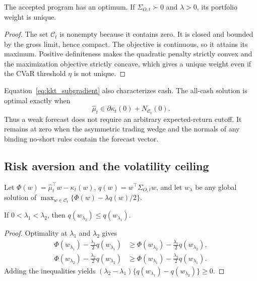 \begin{proposition}
The accepted program has an optimum. If \(\Sigma_{O,t}\succ0\) and \(\lambda>0\), its
portfolio weight is unique.
\end{proposition}
\begin{proof}
The set \(\mathcal C_t\) is nonempty because it contains zero. It is closed and bounded
by the gross limit, hence compact. The objective is continuous, so it attains its maximum.
Positive definiteness makes the quadratic penalty strictly convex and the maximization
objective strictly concave, which gives a unique weight even if the CVaR threshold
\(\eta\) is not unique.
\end{proof}

Equation~\eqref{eq:kkt_subgradient} also characterizes cash. The all-cash solution is
optimal exactly when
\begin{equation}
  \widehat\mu_t\in\partial\kappa_t(0)+N_{\mathcal C_t}(0).
  \label{eq:cash_kkt}
\end{equation}
Thus a weak forecast does not require an arbitrary expected-return cutoff. It remains at
zero when the asymmetric trading wedge and the normals of any binding no-short rules
contain the forecast vector.

\subsection{Risk aversion and the volatility ceiling}

Let \(\Phi(w)=\widehat\mu_t^\top w-\kappa_t(w)\),
\(q(w)=w^\top\Sigma_{O,t}w\), and let \(w_\lambda\) be any global solution of
\(\max_{w\in\mathcal C_t}\{\Phi(w)-\lambda q(w)/2\}\).

\begin{proposition}
If \(0<\lambda_1<\lambda_2\), then \(q(w_{\lambda_2})\le q(w_{\lambda_1})\).
\label{prop:risk_monotonicity}
\end{proposition}
\begin{proof}
Optimality at \(\lambda_1\) and \(\lambda_2\) gives
\begin{align*}
 \Phi(w_{\lambda_1})-\tfrac{\lambda_1}{2}q(w_{\lambda_1})
 &\ge \Phi(w_{\lambda_2})-\tfrac{\lambda_1}{2}q(w_{\lambda_2}),\\
 \Phi(w_{\lambda_2})-\tfrac{\lambda_2}{2}q(w_{\lambda_2})
 &\ge \Phi(w_{\lambda_1})-\tfrac{\lambda_2}{2}q(w_{\lambda_1}).
\end{align*}
Adding the inequalities yields
\((\lambda_2-\lambda_1)\{q(w_{\lambda_1})-q(w_{\lambda_2})\}\ge0\).
\end{proof}

